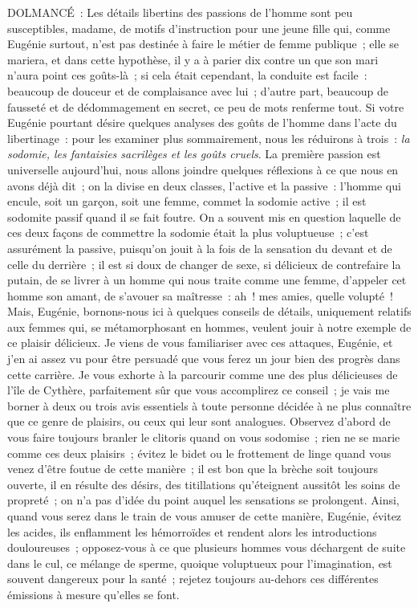 \documentclass[french,twoside]{book} %
\begin{document}
DOLMANCÉ : Les détails libertins des passions de l’homme sont peu susceptibles, madame, de motifs d’instruction pour une jeune fille qui, comme Eugénie surtout, n’est pas destinée à faire le métier de femme publique ; elle se mariera, et dans cette hypothèse, il y a à parier dix contre un que son mari n’aura point ces goûts-là ; si cela était cependant, la conduite est facile : beaucoup de douceur et de complaisance avec lui ; d’autre part, beaucoup de fausseté et de dédommagement en secret, ce peu de mots renferme tout. Si votre Eugénie pourtant désire quelques analyses des goûts de l’homme dans l’acte du libertinage : pour les examiner plus sommairement, nous les réduirons à trois : {\itshape la sodomie, les fantaisies sacrilèges et les goûts cruels}. La première passion est universelle aujourd’hui, nous allons joindre quelques réflexions à ce que nous en avons déjà dit ; on la divise en deux classes, l’active et la passive : l’homme qui encule, soit un garçon, soit une femme, commet la sodomie active ; il est sodomite passif quand il se fait foutre. On a souvent mis en question laquelle de ces deux façons de commettre la sodomie était la plus voluptueuse ; c’est assurément la passive, puisqu’on jouit à la fois de la sensation du devant et de celle du derrière ; il est si doux de changer de sexe, si délicieux de contrefaire la putain, de se livrer à un homme qui nous traite comme une femme, d’appeler cet homme son amant, de s’avouer sa maîtresse : ah ! mes amies, quelle volupté ! Mais, Eugénie, bornons-nous ici à quelques conseils de détails, uniquement relatifs aux femmes qui, se métamorphosant en hommes, veulent jouir à notre exemple de ce plaisir délicieux. Je viens de vous familiariser avec ces attaques, Eugénie, et j’en ai assez vu pour être persuadé que vous ferez un jour bien des progrès dans cette carrière. Je vous exhorte à la parcourir comme une des plus délicieuses de l’île de Cythère, parfaitement sûr que vous accomplirez ce conseil ; je vais me borner à deux ou trois avis essentiels à toute personne décidée à ne plus connaître que ce genre de plaisirs, ou ceux qui leur sont analogues. Observez d’abord de vous faire toujours branler le clitoris quand on vous sodomise ; rien ne se marie comme ces deux plaisirs ; évitez le bidet ou le frottement de linge quand vous venez d’être foutue de cette manière ; il est bon que la brèche soit toujours ouverte, il en résulte des désirs, des titillations qu’éteignent aussitôt les soins de propreté ; on n’a pas d’idée du point auquel les sensations se prolongent. Ainsi, quand vous serez dans le train de vous amuser de cette manière, Eugénie, évitez les acides, ils enflamment les hémorroïdes et rendent alors les introductions douloureuses ; opposez-vous à ce que plusieurs hommes vous déchargent de suite dans le cul, ce mélange de sperme, quoique voluptueux pour l’imagination, est souvent dangereux pour la santé ; rejetez toujours au-dehors ces différentes émissions à mesure qu’elles se font.\par
\end{document}
